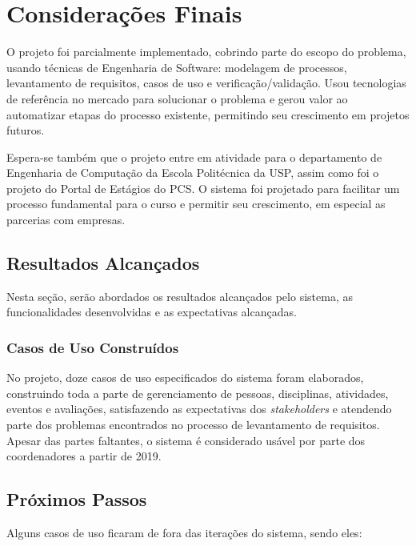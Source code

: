 \chapter{Considerações Finais}\label{chap:consideracoes-finais}
O projeto foi parcialmente implementado, cobrindo parte do escopo do problema, usando técnicas de Engenharia de Software: modelagem de processos, levantamento de requisitos, casos de uso e verificação/validação. Usou tecnologias de referência no mercado para solucionar o problema e gerou valor ao automatizar etapas do processo existente, permitindo seu crescimento em projetos futuros.

Espera-se também que o projeto entre em atividade para o departamento de Engenharia de Computação da Escola Politécnica da USP, assim como foi o projeto do Portal de Estágios do PCS. O sistema foi projetado para facilitar um processo fundamental para o curso e permitir seu crescimento, em especial as parcerias com empresas.

\section{Resultados Alcançados}
Nesta seção, serão abordados os resultados alcançados pelo sistema, as funcionalidades desenvolvidas e as expectativas alcançadas.

\subsection{Casos de Uso Construídos}
No projeto, doze casos de uso especificados do sistema foram elaborados, construindo toda a parte de gerenciamento de pessoas, disciplinas, atividades, eventos e avaliações, satisfazendo as expectativas dos \textit{stakeholders} e atendendo parte dos problemas encontrados no processo de levantamento de requisitos. Apesar das partes faltantes, o sistema é considerado usável por parte dos coordenadores a partir de 2019.

\section{Próximos Passos}
Alguns casos de uso ficaram de fora das iterações do sistema, sendo eles:

